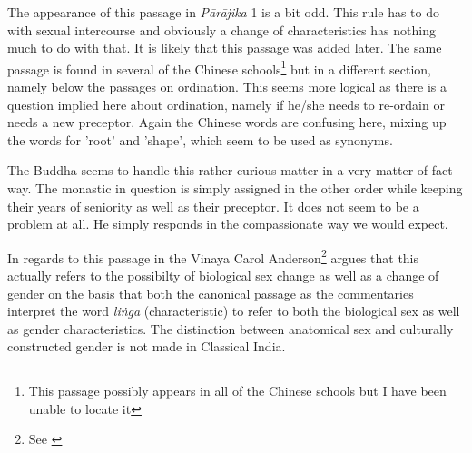 The appearance of this passage in {\em Pārājika} 1 is a bit odd. This rule has to do with sexual intercourse and obviously a change of characteristics has nothing much to do with that. It is likely that this passage was added later. The same passage is found in several of the Chinese schools\footnote{This passage possibly appears in all of the Chinese schools but I have been unable to locate it} but in a different section, namely below the passages on ordination. This seems more logical as there is a question implied here about ordination, namely if he/she needs to re-ordain or needs a new preceptor. Again the Chinese words are confusing here, mixing up the words for 'root' and 'shape', which seem to be used as synonyms.

The Buddha seems to handle this rather curious matter in a very matter-of-fact way. The monastic in question is simply assigned in the other order while keeping their years of seniority as well as their preceptor. It does not seem to be a problem at all. He simply responds in the compassionate way we would expect.

In regards to this passage in the Vinaya Carol Anderson\footnote{See \cite{anderson2016a}} argues that this actually refers to the possibilty of biological sex change as well as a change of gender on the basis that both the canonical passage as the commentaries interpret the word {\em liṅga} (characteristic) to refer to both the biological sex as well as gender characteristics. The distinction between anatomical sex and culturally constructed gender is not made in Classical India.

